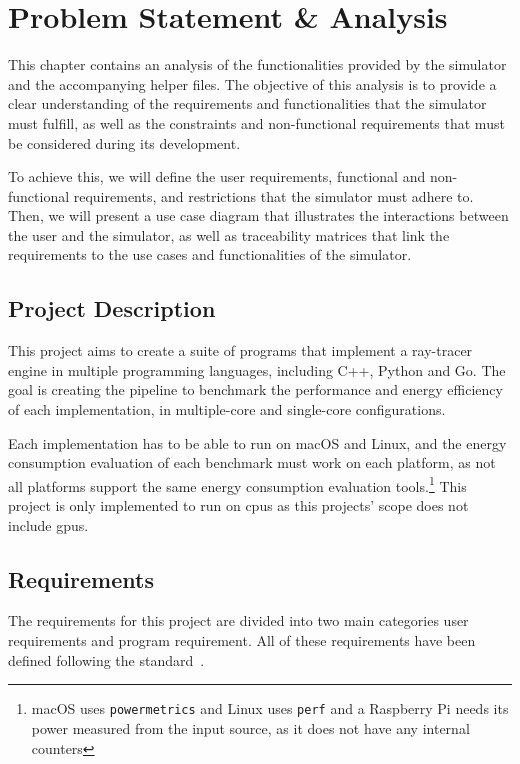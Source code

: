 \chapter{Problem Statement \& Analysis}\label{chap:analysis}

This chapter contains an analysis of the functionalities provided by the simulator and the accompanying helper files. The objective of this analysis is to provide a clear understanding of the requirements and functionalities that the simulator must fulfill, as well as the constraints and non-functional requirements that must be considered during its development.

To achieve this, we will define the user requirements, functional and non-functional requirements, and restrictions that the simulator must adhere to. Then, we will present a use case diagram that illustrates the interactions between the user and the simulator, as well as traceability matrices that link the requirements to the use cases and functionalities of the simulator.

\section{Project Description}
This project aims to create a suite of programs that implement a ray-tracer engine in multiple programming languages, including C++, Python and Go. The goal is creating the pipeline to benchmark the performance and energy efficiency of each implementation, in multiple-core and single-core configurations.

Each implementation has to be able to run on macOS and Linux, and the energy consumption evaluation of each benchmark must work on each platform, as not all platforms support the same energy consumption evaluation tools.\footnote{macOS uses \texttt{powermetrics} and Linux uses \texttt{perf} and a Raspberry Pi needs its power measured from the input source, as it does not have any internal counters} This project is only implemented to run on \glspl{cpu} as this projects' scope does not include \glspl{gpu}.


\section{Requirements}


The requirements for this project are divided into two main categories user requirements and program requirement. All of these requirements have been defined following the standard~\cite{requirements-engineering-iso}. 

